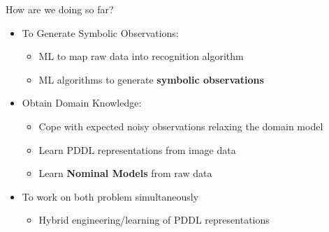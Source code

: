 \documentclass[usenames,dvipsnames]{beamer}
\begin{document}
\begin{frame}[c]{How are we doing so far?}
	\begin{itemize}
		\item To Generate Symbolic Observations:
		\begin{itemize}
			\item ML to map raw data into recognition algorithm {\Large \checkmark}
			\item ML algorithms to generate \textbf{symbolic observations} {\Large \color{red} \checkmark}
		\end{itemize}
		\item Obtain Domain Knowledge:
		\begin{itemize}
			\item Cope with expected noisy observations relaxing the domain model {\Large \checkmark}
			\item Learn PDDL representations from image data {\Large \checkmark}
			\item Learn \textbf{Nominal Models} from raw data {\Large \checkmark}
		\end{itemize}
		\item To work on both problem simultaneously
		\begin{itemize}
			\item Hybrid engineering/learning of PDDL representations {\Large \color{red} \checkmark}
		\end{itemize}
	\end{itemize}
\end{frame}

\end{document}
